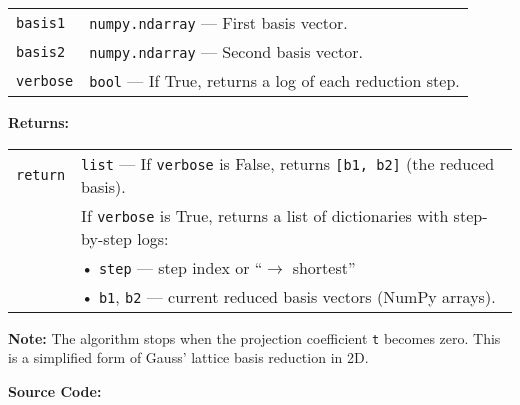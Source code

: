 \documentclass[a4paper,12pt]{article}
\begin{document}
\vspace{0.5em}
\begin{tabular}{p{3cm} p{11cm}}
\texttt{basis1} & \texttt{numpy.ndarray} — First basis vector. \\
\texttt{basis2} & \texttt{numpy.ndarray} — Second basis vector. \\
\texttt{verbose} & \texttt{bool} — If True, returns a log of each reduction step. \\
\end{tabular}

\vspace{1em}
\noindent
\textbf{Returns:}

\vspace{0.5em}
\begin{tabular}{p{3cm} p{11cm}}
\texttt{return} & \texttt{list} — If \texttt{verbose} is False, returns \texttt{[b1, b2]} (the reduced basis).\\
                & If \texttt{verbose} is True, returns a list of dictionaries with step-by-step logs:\\
                & \quad • \texttt{step} — step index or ``$\rightarrow$ shortest''\\
                & \quad • \texttt{b1}, \texttt{b2} — current reduced basis vectors (NumPy arrays).\\
\end{tabular}

\vspace{1em}
\noindent
\textbf{Note:}  
The algorithm stops when the projection coefficient \texttt{t} becomes zero.  
This is a simplified form of Gauss’ lattice basis reduction in 2D.

\textbf{Source Code:}
\end{document}
